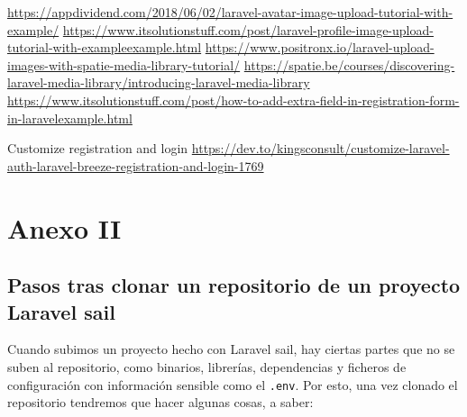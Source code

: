 \documentclass[11pt]{article}
\begin{document}
\url{https://appdividend.com/2018/06/02/laravel-avatar-image-upload-tutorial-with-example/}
\url{https://www.itsolutionstuff.com/post/laravel-profile-image-upload-tutorial-with-exampleexample.html}
\url{https://www.positronx.io/laravel-upload-images-with-spatie-media-library-tutorial/}
\url{https://spatie.be/courses/discovering-laravel-media-library/introducing-laravel-media-library}
\url{https://www.itsolutionstuff.com/post/how-to-add-extra-field-in-registration-form-in-laravelexample.html}

Customize registration and login
\url{https://dev.to/kingsconsult/customize-laravel-auth-laravel-breeze-registration-and-login-1769}


\newpage


\section{Anexo II}
\label{sec:orgab4188a}
\subsection{Pasos tras clonar un repositorio de un proyecto Laravel sail}
\label{sec:org2b15ddc}
Cuando subimos un proyecto hecho con Laravel sail, hay ciertas partes
que no se suben al repositorio, como binarios, librerías, dependencias
y ficheros de configuración con información sensible como el
\texttt{.env}. Por esto, una vez clonado el repositorio tendremos que hacer
algunas cosas, a saber:
\end{document}
